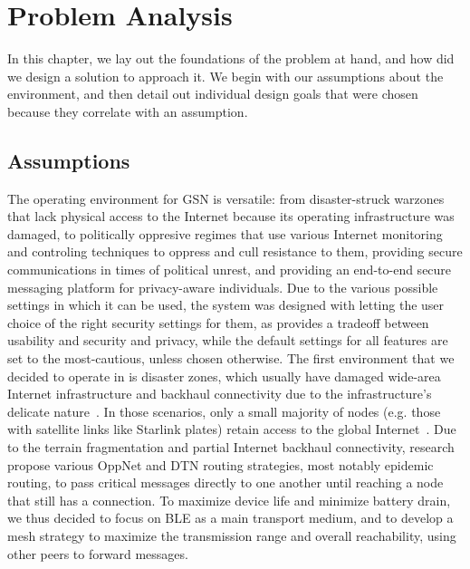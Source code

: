 \chapter{Problem Analysis}
\label{chap:problem}
In this chapter, we lay out the foundations of the problem at hand, and how did we design a solution to approach it. We begin with our assumptions about the environment, and then detail out individual design goals that were chosen because they correlate with an assumption.
\section{Assumptions}
\label{sec:ass}
The operating environment for GSN is versatile: from disaster-struck warzones that lack physical access to the Internet because its operating infrastructure was damaged, to politically oppresive regimes that use various Internet monitoring and controling techniques to oppress and cull resistance to them, providing secure communications in times of political unrest, and providing an end-to-end secure messaging platform for privacy-aware individuals.
Due to the various possible settings in which it can be used, the system was designed with letting the user choice of the right security settings for them, as provides a tradeoff between usability and security and privacy, while the default settings for all features are set to the most-cautious, unless chosen otherwise.
The first environment that we decided to operate in is disaster zones, which usually have damaged wide-area Internet infrastructure and backhaul connectivity due to the infrastructure's delicate nature~\cite{Legendre2011,Liu2026,Hasan2025}. In those scenarios, only a small majority of nodes (e.g. those with satellite links like Starlink plates) retain access to the global Internet~\cite{Liu2026}. Due to the terrain fragmentation and partial Internet backhaul connectivity, research propose various OppNet and DTN routing strategies, most notably epidemic routing, to pass critical messages directly to one another until reaching a node that still has a connection. To maximize device life and minimize battery drain, we thus decided to focus on BLE as a main transport medium, and to develop a mesh strategy to maximize the transmission range and overall reachability, using other peers to forward messages.
